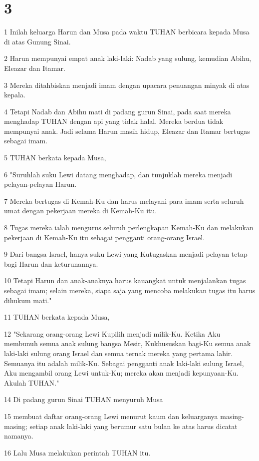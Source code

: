 \chapter{3}

\par 1 Inilah keluarga Harun dan Musa pada waktu TUHAN berbicara kepada Musa di atas Gunung Sinai.
\par 2 Harun mempunyai empat anak laki-laki: Nadab yang sulung, kemudian Abihu, Eleazar dan Itamar.
\par 3 Mereka ditahbiskan menjadi imam dengan upacara penuangan minyak di atas kepala.
\par 4 Tetapi Nadab dan Abihu mati di padang gurun Sinai, pada saat mereka menghadap TUHAN dengan api yang tidak halal. Mereka berdua tidak mempunyai anak. Jadi selama Harun masih hidup, Eleazar dan Itamar bertugas sebagai imam.
\par 5 TUHAN berkata kepada Musa,
\par 6 "Suruhlah suku Lewi datang menghadap, dan tunjuklah mereka menjadi pelayan-pelayan Harun.
\par 7 Mereka bertugas di Kemah-Ku dan harus melayani para imam serta seluruh umat dengan pekerjaan mereka di Kemah-Ku itu.
\par 8 Tugas mereka ialah mengurus seluruh perlengkapan Kemah-Ku dan melakukan pekerjaan di Kemah-Ku itu sebagai pengganti orang-orang Israel.
\par 9 Dari bangsa Israel, hanya suku Lewi yang Kutugaskan menjadi pelayan tetap bagi Harun dan keturunannya.
\par 10 Tetapi Harun dan anak-anaknya harus kauangkat untuk menjalankan tugas sebagai imam; selain mereka, siapa saja yang mencoba melakukan tugas itu harus dihukum mati."
\par 11 TUHAN berkata kepada Musa,
\par 12 "Sekarang orang-orang Lewi Kupilih menjadi milik-Ku. Ketika Aku membunuh semua anak sulung bangsa Mesir, Kukhususkan bagi-Ku semua anak laki-laki sulung orang Israel dan semua ternak mereka yang pertama lahir. Semuanya itu adalah milik-Ku. Sebagai pengganti anak laki-laki sulung Israel, Aku mengambil orang Lewi untuk-Ku; mereka akan menjadi kepunyaan-Ku. Akulah TUHAN."
\par 14 Di padang gurun Sinai TUHAN menyuruh Musa
\par 15 membuat daftar orang-orang Lewi menurut kaum dan keluarganya masing-masing; setiap anak laki-laki yang berumur satu bulan ke atas harus dicatat namanya.
\par 16 Lalu Musa melakukan perintah TUHAN itu.
